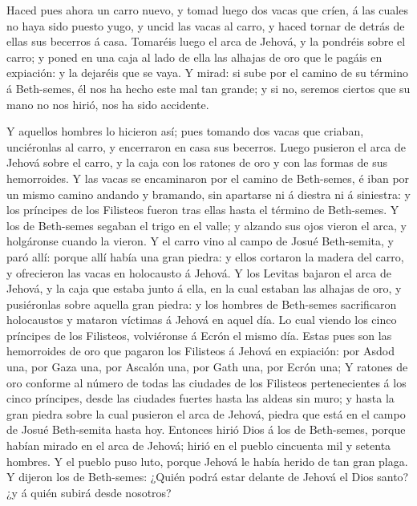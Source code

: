  Haced pues ahora un carro nuevo, y tomad luego dos vacas
que críen, á las cuales no haya sido puesto yugo, y uncid las vacas al
carro, y haced tornar de detrás de ellas sus becerros á casa.
 Tomaréis luego el arca de Jehová, y la pondréis sobre el
carro; y poned en una caja al lado de ella las alhajas de oro que le
pagáis en expiación: y la dejaréis que se vaya.  Y mirad: si
sube por el camino de su término á Beth-semes, él nos ha hecho este mal
tan grande; y si no, seremos ciertos que su mano no nos hirió, nos ha
sido accidente.

 Y aquellos hombres lo hicieron así; pues tomando dos vacas
que criaban, unciéronlas al carro, y encerraron en casa sus becerros.
 Luego pusieron el arca de Jehová sobre el carro, y la caja
con los ratones de oro y con las formas de sus hemorroides.
 Y las vacas se encaminaron por el camino de Beth-semes, é
iban por un mismo camino andando y bramando, sin apartarse ni á diestra
ni á siniestra: y los príncipes de los Filisteos fueron tras ellas hasta
el término de Beth-semes.  Y los de Beth-semes segaban el
trigo en el valle; y alzando sus ojos vieron el arca, y holgáronse
cuando la vieron.  Y el carro vino al campo de Josué
Beth-semita, y paró allí: porque allí había una gran piedra: y ellos
cortaron la madera del carro, y ofrecieron las vacas en holocausto á
Jehová.  Y los Levitas bajaron el arca de Jehová, y la caja
que estaba junto á ella, en la cual estaban las alhajas de oro, y
pusiéronlas sobre aquella gran piedra: y los hombres de Beth-semes
sacrificaron holocaustos y mataron víctimas á Jehová en aquel día.
 Lo cual viendo los cinco príncipes de los Filisteos,
volviéronse á Ecrón el mismo día.  Estas pues son las
hemorroides de oro que pagaron los Filisteos á Jehová en expiación: por
Asdod una, por Gaza una, por Ascalón una, por Gath una, por Ecrón una;
 Y ratones de oro conforme al número de todas las ciudades
de los Filisteos pertenecientes á los cinco príncipes, desde las
ciudades fuertes hasta las aldeas sin muro; y hasta la gran piedra sobre
la cual pusieron el arca de Jehová, piedra que está en el campo de Josué
Beth-semita hasta hoy.  Entonces hirió Dios á los de
Beth-semes, porque habían mirado en el arca de Jehová; hirió en el
pueblo cincuenta mil y setenta hombres. Y el pueblo puso luto, porque
Jehová le había herido de tan gran plaga.  Y dijeron los de
Beth-semes: ¿Quién podrá estar delante de Jehová el Dios santo? ¿y á
quién subirá desde nosotros?

